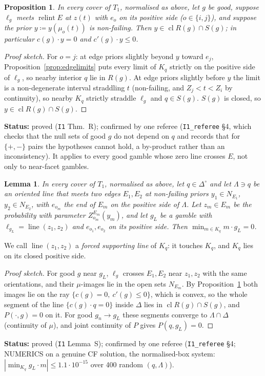 \documentclass[11pt]{article}
\newtheorem{lemma}[theorem]{Lemma}
\newtheorem{proposition}[theorem]{Proposition}
\theoremstyle{definition}
\theoremstyle{remark}
\newcommand{\Di}{\Delta^{\circ}}
\newcommand{\cl}{\operatorname{cl}}
\newcommand{\relint}{\operatorname{relint}}
\newcommand{\lin}{\operatorname{line}}
\newcommand{\src}[1]{\texttt{#1}}
\newcommand{\status}[1]{\par\smallskip\noindent\textbf{Status:} #1\par\smallskip}
\begin{document}
\begin{proposition}\label{prop:clines}
In every cover of $T_1$, normalised as above, let $g$ be good, suppose $\ell_g$ meets $\relint E$ at $z(t)$ with $e_o$ on its positive side ($o\in\{i,j\}$), and suppose the prior $y\coloneqq y(\mu_o(t))$ is non-failing. Then $y\in\cl R(g)\cap S(g)$; in particular $c(g)\cdot y=0$ and $c'(g)\cdot y\le0$.
\end{proposition}
\begin{proof}[Proof sketch]
For $o=j$: at edge priors slightly beyond $y$ toward $e_j$, Proposition~\ref{prop:edgelimits} puts every limit of $K_q$ strictly on the positive side of $\ell_g$, so nearby interior $q$ lie in $R(g)$. At edge priors slightly before $y$ the limit is a non-degenerate interval straddling $t$ (non-failing, and $Z_j<t<Z_i$ by continuity), so nearby $K_q$ strictly straddle $\ell_g$ and $q\in S(g)$. $S(g)$ is closed, so $y\in\cl R(g)\cap S(g)$.
\end{proof}
\status{proved (\src{I1} Thm.~R); confirmed by one referee (\src{I1\_referee} \S4, which checks that the null sets of good $g$ do not depend on $q$ and records that for $\{+,-\}$ pairs the hypotheses cannot hold, a by-product rather than an inconsistency). It applies to every good gamble whose zero line crosses $E$, not only to near-facet gambles.}

\begin{lemma}\label{lem:forcedlines}
In every cover of $T_1$, normalised as above, let $q\in\Di$ and let $\Lambda\ni q$ be an oriented line that meets two edges $E_1,E_2$ at non-failing priors $y_1\in N_{E_1}$, $y_2\in N_{E_2}$, with $e_{o_m}$ the end of $E_m$ on the positive side of $\Lambda$. Let $z_m\in E_m$ be the probability with parameter $Z^{E_m}_{o_m}(y_m)$, and let $g_L$ be a gamble with $\ell_{g_L}=\lin(z_1,z_2)$ and $e_{o_1},e_{o_2}$ on its positive side. Then $\min_{m\in K_q}m\cdot g_L=0$.
\end{lemma}
We call $\lin(z_1,z_2)$ a \emph{forced supporting line} of $K_q$: it touches $K_q$, and $K_q$ lies on its closed positive side.
\begin{proof}[Proof sketch]
For good $g$ near $g_L$, $\ell_g$ crosses $E_1,E_2$ near $z_1,z_2$ with the same orientations, and their $\mu$-images lie in the open sets $N_{E_m}$. By Proposition~\ref{prop:clines} both images lie on the ray $\{c(g)=0,\ c'(g)\le0\}$, which is convex, so the whole segment of the line $\{c(g)\cdot q=0\}$ inside $\Delta$ lies in $\cl R(g)\cap S(g)$, and $P(\cdot,g)=0$ on it. For good $g_n\to g_L$ these segments converge to $\Lambda\cap\Delta$ (continuity of $\mu$), and joint continuity of $P$ gives $P(q,g_L)=0$.
\end{proof}
\status{proved (\src{I1} Lemma~S); confirmed by one referee (\src{I1\_referee} \S4; NUMERICS on a genuine CF solution, the normalised-box system: $|\min_{K_q}g_L\cdot m|\le1.1\cdot10^{-15}$ over 400 random $(q,\Lambda)$).}
\end{document}
